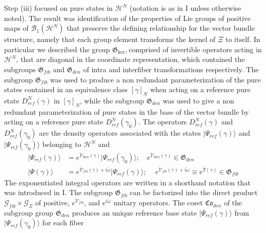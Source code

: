 \documentclass[aps,preprint]{revtex4}%
\begin{document}
Step (iii) focused on pure states in $\mathcal{H}^{N}$ (notation is as in I
unless otherwise noted). The result was identification of the properties of
Lie groups of positive maps of $\mathcal{B}_{1}\left(  \mathcal{H}^{N}\right)
$ that preserve the defining relationship for the vector bundle structure,
namely that each group element transforms the kernel of $\Xi$ to itself. In
particular we described the group $\mathfrak{G}_{\ker}$,$\mathcal{\ }%
$comprised of invertible operators acting in $\mathcal{H}^{N}$, that are
diagonal in the coordinate representation, which contained the subgroups
$\mathfrak{G}_{fib}$ and $\mathfrak{G}_{den}$ of intra and interfiber
transformations respectively. The subgroup $\mathfrak{G}_{fib}$ was used to
produce a non redundant parameterization of the pure states contained in an
equivalence class $\left[  \gamma\right]  _{N}$ when acting on a reference
pure state $D_{ref}^{N}\left(  \gamma\right)  $ in $\left[  \gamma\right]
_{N}$, while the subgroup $\mathfrak{G}_{den}$ was used to give a non
redundant parameterization of pure states in the base of the vector bundle by
acting on a reference pure state $D_{ref}^{N}\left(  \gamma_{0}\right)  $. The
operators $D_{ref}^{N}\left(  \gamma\right)  $ and $D_{ref}^{N}\left(
\gamma_{0}\right)  $ are the density operators associated with the states
$|\Psi_{ref}\left(  \gamma\right)  \rangle$ and $|\Psi_{ref}\left(  \gamma
_{0}\right)  \rangle$ belonging to $\mathcal{H}^{N}$ and
\begin{align}
|\Psi_{ref}\left(  \gamma\right)  \rangle &  =e^{\mathcal{\breve{V}}%
_{den}\left(  \gamma\right)  }|\Psi_{ref}\left(  \gamma_{0}\right)
\rangle;\quad e^{\mathcal{\breve{V}}_{den}\left(  \gamma\right)  }%
\in\mathfrak{G}_{den}\nonumber\\
|\Psi\left(  \gamma\right)  \rangle &  =e^{\mathcal{\breve{V}}_{fib}%
(\gamma)+i\breve{\omega}}|\Psi_{ref}\left(  \gamma\right)  \rangle;\,\quad
e^{\mathcal{\breve{V}}_{fib}(\gamma)+i\breve{\omega}}\equiv e^{\breve
{\Upsilon}\left(  \gamma\right)  }\in\mathfrak{G}_{fib}%
\end{align}
The exponentiated integral operators are written in a shorthand notation that
was introduced in I. The subgroup $\mathfrak{G}_{fib}$ can be factorized into
the direct product $\mathcal{G}_{fib}\times\mathcal{G}_{\Xi}$ of positive,
$e^{\mathcal{\breve{V}}_{fib}}$, and $e^{i\breve{\omega}}$ unitary operators.
The coset $\mathfrak{Co}_{den}$ of the subgroup group $\mathfrak{G}_{den}$
produces an unique reference base state $|\Psi_{ref}\left(  \gamma\right)
\rangle$ from $|\Psi_{ref}\left(  \gamma_{0}\right)  \rangle$ for each fiber
\end{document}
